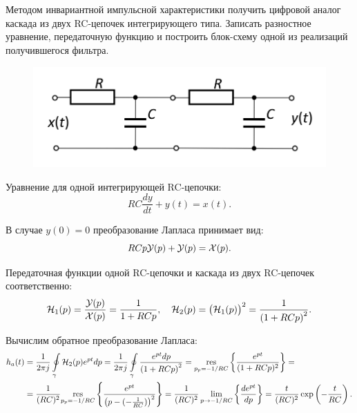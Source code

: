 \protect\thispagestyle{fancy}
\section{}
Методом инвариантной импульсной характеристики получить цифровой аналог каскада из двух RC-цепочек интегрирующего типа. Записать разностное уравнение, передаточную функцию и построить блок-схему одной из реализаций получившегося фильтра.

\begin{figure}[!h]
	\centering
	\includegraphics[width=0.55\columnwidth]{pics/fall/11/11-01.png}
	\label{fig:11-01}
\end{figure}

Уравнение для одной интегрирующей RC-цепочки:
\begin{equation*}
	RC \dfrac{dy}{dt} + y(t) = x(t).
\end{equation*}

В случае $y(0) = 0$ преобразование Лапласа принимает вид:
\begin{equation*}
	RC p \mathcal{Y}(p) + \mathcal{Y}(p) = \mathcal{X}(p).
\end{equation*}

Передаточная функции одной RC-цепочки и каскада из двух RC-цепочек соответственно:
\begin{equation*}
	\mathcal{H}_1(p) = \dfrac{\mathcal{Y}(p)}{\mathcal{X}(p)} = \dfrac{1}{1 + RCp},\quad
	\mathcal{H}_2(p) = \big(\mathcal{H}_1(p)\big)^2 = \dfrac{1}{\left(1 + RCp\right)^2}.
\end{equation*}

Вычислим обратное преобразование Лапласа:
\begin{align*}
	h_a(t) &= \dfrac{1}{2 \pi j} \oint \limits_{\gamma} \mathcal{H}_2(p) e^{pt} dp = 
	\dfrac{1}{2 \pi j} \oint \limits_{\gamma} \dfrac{e^{pt} dp}{\left(1 + RCp\right)^2} = 
	\underset{p_p = -1/RC}{\text{res}} \left\{\dfrac{e^{pt}}{(1 + RCp)^2}\right\} =\\ &=
	\dfrac{1}{(RC)^2}\underset{p_p = -1/RC}{\text{res}} \left\{\dfrac{e^{pt}}{\left(p - (-\frac{1}{RC})\right)^2}\right\} =
	\dfrac{1}{(RC)^2} \lim \limits_{p \to -1/RC} \left\{\dfrac{de^{pt}}{dp}\right\} =
	\dfrac{t}{(RC)^2} \exp\left(-\dfrac{t}{RC}\right).
\end{align*}

